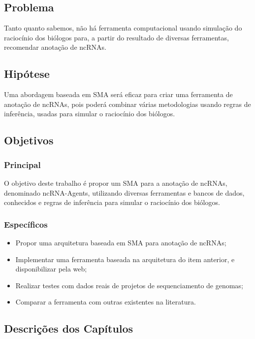\subsection{Problema}

Tanto quanto sabemos, não há ferramenta computacional usando simulação do raciocínio dos biólogos para, a partir do resultado de diversas ferramentas, recomendar anotação de ncRNAs.


\subsection{Hipótese} \label{sec:hipotese}

Uma abordagem baseada em SMA será eficaz para criar uma ferramenta de anotação de ncRNAs, pois poderá combinar várias metodologias usando regras de inferência, usadas para simular o raciocínio dos biólogos.

\subsection{Objetivos} \label{sec:objetivos}


\subsubsection*{Principal}

O objetivo deste trabalho é propor um SMA para a anotação de ncRNAs, denominado ncRNA-Agents, utilizando diversas ferramentas e bancos de dados, conhecidos e regras de inferência para simular o raciocínio dos biólogos.

\subsubsection*{Específicos}

\begin{itemize}
\item Propor uma arquitetura baseada em SMA para anotação de ncRNAs;
\item Implementar uma ferramenta baseada na arquitetura do item anterior, e disponibilizar pela web;
\item Realizar testes com dados reais de projetos de sequenciamento de genomas;
\item Comparar a ferramenta com outras existentes na literatura.
\end{itemize}

\subsection{Descrições dos Capítulos}

